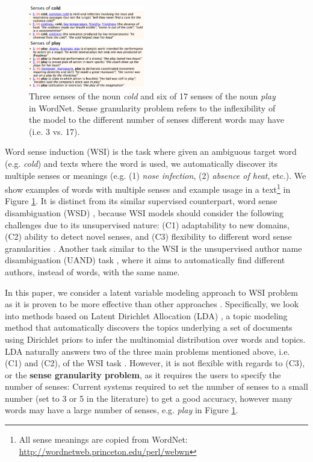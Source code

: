 \documentclass[letterpaper]{article}
\begin{document}
\begin{figure}
    \centering
    \includegraphics[width=0.45\textwidth]{example_senses}
    \caption{Three senses of the noun \textit{cold} and six of 17 senses of the noun \textit{play} in WordNet. Sense granularity problem refers to the inflexibility of the model to the different number of senses different words may have (i.e. 3 vs. 17).}
    \label{fig:wsi_example}
\end{figure}

Word sense induction (WSI) is the task where given an ambiguous target word (e.g. \textit{cold}) and texts where the word is used, we automatically discover its multiple senses or meanings (e.g. (1) \textit{nose infection}, (2) \textit{absence of heat}, etc.). We show examples of words with multiple senses and example usage in a text\footnote{All sense meanings are copied from WordNet: \url{http://wordnetweb.princeton.edu/perl/webwn}} in Figure \ref{fig:wsi_example}. It is distinct from its similar supervised counterpart, word sense disambiguation (WSD) \cite{stevenson2003word}, because WSI models should consider the following challenges due to its unsupervised nature: (C1) adaptability to new domains, (C2) ability to detect novel senses, and (C3) flexibility to different word sense granularities \cite{jurgens2013semeval}. Another task similar to the WSI is the unsupervised author name disambiguation (UAND) task \cite{song2007efficient}, where it aims to automatically find different authors, instead of words, with the same name.

In this paper, we consider a latent variable modeling approach to WSI problem as it is proven to be more effective than other approaches \cite{chang2014inducing,komninos2016structured}. Specifically, we look into methods based on Latent Dirichlet Allocation (LDA) \cite{blei2003latent}, a topic modeling method that automatically discovers the topics underlying a set of documents using Dirichlet priors to infer the multinomial distribution over words and topics. LDA naturally answers two of the three main problems mentioned above, i.e. (C1) and (C2), of the WSI task \cite{brody2009bayesian}. However, it is not flexible with regards to (C3), or the \textbf{sense granularity problem}, as it requires the users to specify the number of senses: Current systems \cite{wang2015sense,chang2014inducing} required to set the number of senses to a small number (set to 3 or 5 in the literature) to get a good accuracy, however many words may have a large number of senses, e.g. \textit{play} in Figure \ref{fig:wsi_example}.
\end{document}
